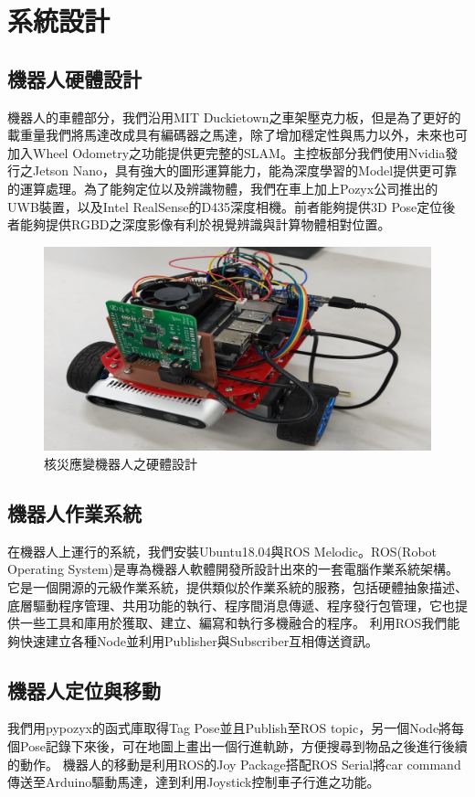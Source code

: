 \section{系統設計}

\subsection{機器人硬體設計}
機器人的車體部分，我們沿用MIT Duckietown之車架壓克力板，但是為了更好的載重量我們將馬達改成具有編碼器之馬達，除了增加穩定性與馬力以外，未來也可加入Wheel Odometry之功能提供更完整的SLAM。主控板部分我們使用Nvidia發行之Jetson Nano，具有強大的圖形運算能力，能為深度學習的Model提供更可靠的運算處理。為了能夠定位以及辨識物體，我們在車上加上Pozyx公司推出的UWB裝置，以及Intel RealSense的D435深度相機。前者能夠提供3D Pose定位後者能夠提供RGBD之深度影像有利於視覺辨識與計算物體相對位置。


\begin{figure}[h] %
  \centering
    \includegraphics[width=0.8\columnwidth]{images/jetson-car_2.jpg}	
      \caption{核災應變機器人之硬體設計}
    \label{figure:car2}
\end{figure}

\subsection{機器人作業系統}
在機器人上運行的系統，我們安裝Ubuntu18.04與ROS Melodic。ROS(Robot Operating System)是專為機器人軟體開發所設計出來的一套電腦作業系統架構。它是一個開源的元級作業系統，提供類似於作業系統的服務，包括硬體抽象描述、底層驅動程序管理、共用功能的執行、程序間消息傳遞、程序發行包管理，它也提供一些工具和庫用於獲取、建立、編寫和執行多機融合的程序。
利用ROS我們能夠快速建立各種Node並利用Publisher與Subscriber互相傳送資訊。

\subsection{機器人定位與移動}
我們用pypozyx的函式庫取得Tag Pose並且Publish至ROS topic，另一個Node將每個Pose記錄下來後，可在地圖上畫出一個行進軌跡，方便搜尋到物品之後進行後續的動作。
機器人的移動是利用ROS的Joy Package搭配ROS Serial將car command傳送至Arduino驅動馬達，達到利用Joystick控制車子行進之功能。

